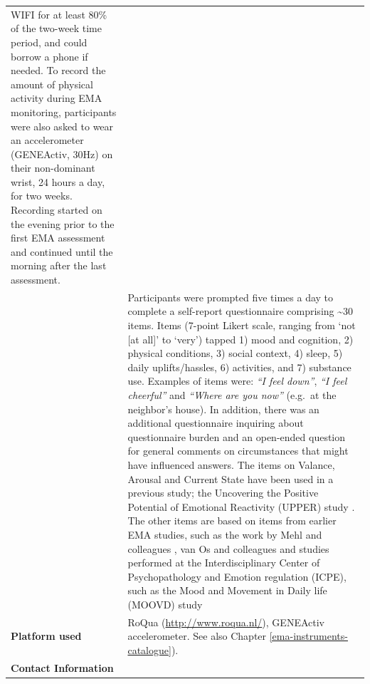\documentclass[]{book}
\begin{document}
\begin{longtable}[]{@{}ll@{}}
\begin{minipage}[t]{0.69\columnwidth}
WIFI for at least 80\% of the two-week time period, and could borrow a
phone if needed. To record the amount of physical activity during EMA
monitoring, participants were also asked to wear an accelerometer
(GENEActiv, 30Hz) on their non-dominant wrist, 24 hours a day, for two
weeks. Recording started on the evening prior to the first EMA
assessment and continued until the morning after the last
assessment.\strut
\end{minipage}\tabularnewline
\begin{minipage}[t]{0.25\columnwidth}\raggedright\strut
\strut
\end{minipage} & \begin{minipage}[t]{0.69\columnwidth}\raggedright\strut
Participants were prompted five times a day to complete a self-report
questionnaire comprising \textasciitilde{}30 items. Items (7-point
Likert scale, ranging from `not {[}at all{]}' to `very') tapped 1) mood
and cognition, 2) physical conditions, 3) social context, 4) sleep, 5)
daily uplifts/hassles, 6) activities, and 7) substance use. Examples of
items were: \emph{``I feel down''}, \emph{``I feel cheerful''} and
\emph{``Where are you now''} (e.g.~at the neighbor's house). In
addition, there was an additional questionnaire inquiring about
questionnaire burden and an open-ended question for general comments on
circumstances that might have influenced answers. The items on Valance,
Arousal and Current State have been used in a previous study; the
Uncovering the Positive Potential of Emotional Reactivity (UPPER) study
\citep{Bennik2015}. The other items are based on items from earlier EMA
studies, such as the work by Mehl and colleagues \citep{Mehl2012}, van
Os and colleagues \citep{Wichers2012} and studies performed at the
Interdisciplinary Center of Psychopathology and Emotion regulation
(ICPE), such as the Mood and Movement in Daily life (MOOVD) study
\citep{Booij2015}\strut
\end{minipage}\tabularnewline
\begin{minipage}[t]{0.25\columnwidth}\raggedright\strut
\textbf{Platform used}\strut
\end{minipage} & \begin{minipage}[t]{0.69\columnwidth}\raggedright\strut
RoQua (\url{http://www.roqua.nl/}), GENEActiv accelerometer. See also
Chapter \ref{ema-instruments-catalogue}).\strut
\end{minipage}\tabularnewline
\begin{minipage}[t]{0.25\columnwidth}\raggedright\strut
\textbf{Contact Information}\strut

\end{minipage}
\end{longtable}
\end{document}
